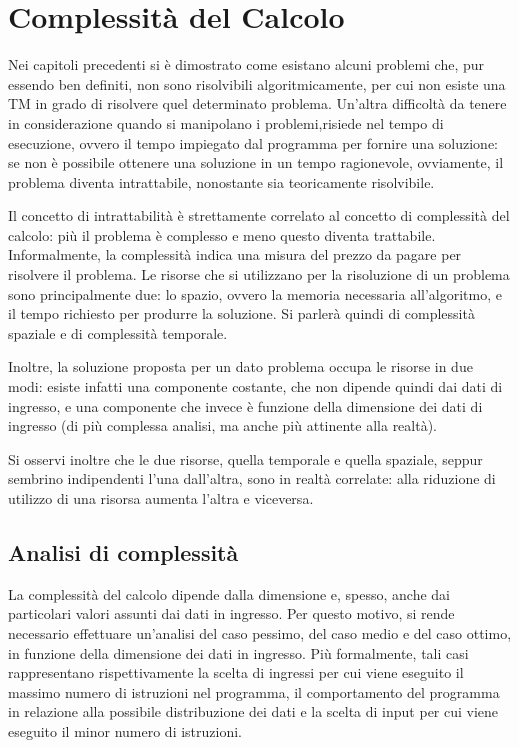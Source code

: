 \chapter{Complessità del Calcolo}
  Nei capitoli precedenti si è dimostrato come esistano alcuni problemi che, pur essendo ben definiti, non sono risolvibili algoritmicamente, per cui non esiste una TM in grado di risolvere quel determinato problema. Un'altra difficoltà da tenere in considerazione quando si manipolano i problemi,risiede nel tempo di esecuzione, ovvero il tempo impiegato dal programma per fornire una soluzione: se non è possibile ottenere una soluzione in un tempo ragionevole, ovviamente, il problema diventa intrattabile, nonostante sia teoricamente risolvibile.

  Il concetto di intrattabilità è strettamente correlato al concetto di complessità del calcolo: più il problema è complesso e meno questo diventa trattabile. Informalmente, la complessità indica una misura del prezzo da pagare per risolvere il problema. Le risorse che si utilizzano per la risoluzione di un problema sono principalmente due: lo spazio, ovvero la memoria necessaria all'algoritmo, e il tempo richiesto per produrre la soluzione. Si parlerà quindi di complessità spaziale e di complessità temporale.

  Inoltre, la soluzione proposta per un dato problema occupa le risorse in due modi: esiste infatti una componente costante, che non dipende quindi dai dati di ingresso, e una componente che invece è funzione della dimensione dei dati di ingresso (di più complessa analisi, ma anche più attinente alla realtà). 

  Si osservi inoltre che le due risorse, quella temporale e quella spaziale, seppur sembrino indipendenti l'una dall'altra, sono in realtà correlate: alla riduzione di utilizzo di una risorsa aumenta l'altra e viceversa. 

  \section{Analisi di complessità}
  La complessità del calcolo dipende dalla dimensione e, spesso, anche dai particolari valori assunti dai dati in ingresso. Per questo motivo, si rende necessario effettuare un'analisi del caso pessimo, del caso medio e del caso ottimo, in funzione della dimensione dei dati in ingresso. Più formalmente, tali casi rappresentano rispettivamente la scelta di ingressi per cui viene eseguito il massimo numero di istruzioni nel programma, il comportamento del programma in relazione alla possibile distribuzione dei dati e la scelta di input per cui viene eseguito il minor numero di istruzioni.

